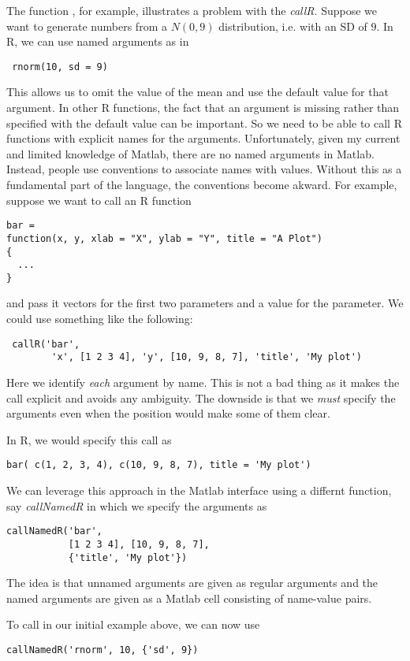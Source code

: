 \documentclass{article}
\def\MatlabFun#1{\textsl{#1}}
\begin{document}
The function , for example, illustrates a problem
with the \MatlabFun{callR}.  Suppose we want to generate numbers from
a $N(0, 9)$ distribution, i.e. with an SD of $9$.  In R, we can use
named arguments as in
\begin{verbatim}
 rnorm(10, sd = 9)
\end{verbatim}
This allows us to omit the value of the mean and use the default value
for that argument.  In other R functions, the fact that an argument is
missing rather than specified with the default value can be important.
So we need to be able to call R functions with explicit names for the
arguments.  Unfortunately, given my current and limited knowledge of
Matlab, there are no named arguments in Matlab. Instead, people use
conventions to associate names with values.  Without this as a
fundamental part of the language, the conventions become akward.
For example, suppose we want to call an R function
\begin{verbatim}
bar =
function(x, y, xlab = "X", ylab = "Y", title = "A Plot")
{
  ...
}
\end{verbatim}
and pass it vectors for the first two parameters
and a value for the  parameter.
We could use something like the following:
\begin{verbatim}
 callR('bar', 
        'x', [1 2 3 4], 'y', [10, 9, 8, 7], 'title', 'My plot')
\end{verbatim}
Here we identify \textit{each} argument by name.  This is not a bad
thing as it makes the call explicit and avoids any ambiguity.  The
downside is that we \textit{must} specify the arguments even when the
position would make some of them clear. 

In R, we would specify this call as
\begin{verbatim}
bar( c(1, 2, 3, 4), c(10, 9, 8, 7), title = 'My plot')
\end{verbatim}
We can leverage this approach in the Matlab interface using a differnt
function, say \MatlabFun{callNamedR} in which we specify the arguments
as
\begin{verbatim}
callNamedR('bar',
           [1 2 3 4], [10, 9, 8, 7], 
           {'title', 'My plot'})
\end{verbatim}
The idea is that unnamed arguments are given as regular arguments and
the named arguments are given as a Matlab cell consisting of
name-value pairs.

To call   in our initial example above,
we can now use
\begin{verbatim}
callNamedR('rnorm', 10, {'sd', 9})
\end{verbatim}
\end{document}
